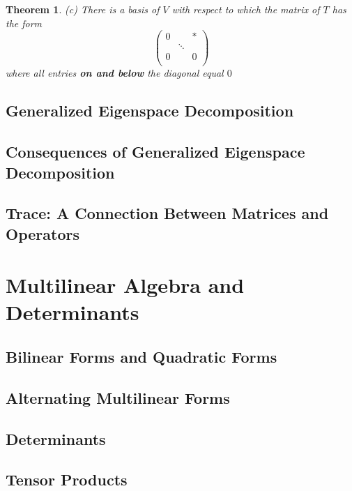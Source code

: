 \documentclass{article}
\newtheorem{theorem}{Theorem}[subsection]
\begin{document}
\begin{CJK}{UTF8}{gkai}
\begin{theorem}
    (c) There is a basis of $V$ with respect to which the matrix of $T$ has the form
    \[\begin{pmatrix}
        0&&\ast\\
        &\ddots&\\
        0&&0\\
    \end{pmatrix}\]
    where all entries \textbf{on and below} the diagonal equal $0$
\end{theorem}
\subsection{Generalized Eigenspace Decomposition}

\subsection{Consequences of Generalized Eigenspace Decomposition}

\subsection{Trace: A Connection Between Matrices and Operators}

\section{Multilinear Algebra and Determinants}

\subsection{Bilinear Forms and Quadratic Forms}

\subsection{Alternating Multilinear Forms}

\subsection{Determinants}

\subsection{Tensor Products}

\end{CJK}
\end{document}
